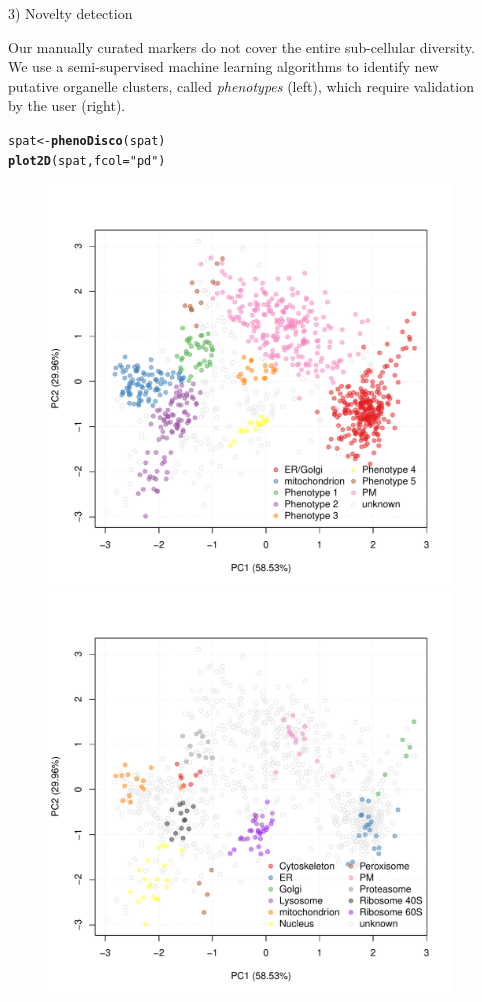 \documentclass[final]{beamer}\usepackage[]{graphicx}\usepackage[]{color}
\makeatletter
\newcommand{\hlstr}[1]{\textcolor[rgb]{0.192,0.494,0.8}{#1}}%
\newcommand{\hlstd}[1]{\textcolor[rgb]{0.345,0.345,0.345}{#1}}%
\newcommand{\hlkwb}[1]{\textcolor[rgb]{0.69,0.353,0.396}{#1}}%
\newcommand{\hlkwc}[1]{\textcolor[rgb]{0.333,0.667,0.333}{#1}}%
\newcommand{\hlkwd}[1]{\textcolor[rgb]{0.737,0.353,0.396}{\textbf{#1}}}%
\newenvironment{kframe}{%
 \def\at@end@of@kframe{}%
 \ifinner\ifhmode%
  \def\at@end@of@kframe{\end{minipage}}%
  \begin{minipage}{\columnwidth}%
 \fi\fi%
 \def\FrameCommand##1{\hskip\@totalleftmargin \hskip-\fboxsep
 \colorbox{shadecolor}{##1}\hskip-\fboxsep
     \hskip-\linewidth \hskip-\@totalleftmargin \hskip\columnwidth}%
 \MakeFramed {\advance\hsize-\width
   \@totalleftmargin\z@ \linewidth\hsize
   \@setminipage}}%
 {\par\unskip\endMakeFramed%
 \at@end@of@kframe}
\newenvironment{knitrout}{}{} %
\makeatother
\begin{document}
\begin{frame}[fragile]
\begin{columns}
\begin{column}{.48\textwidth}
    \end{column}

    \begin{column}{.48\textwidth}  

      \begin{block}{3) Novelty detection}
        
        Our manually curated markers do not cover the entire
        sub-cellular diversity. We use a semi-supervised machine
        learning algorithms to identify new putative organelle
        clusters, called \emph{phenotypes} (left), which require
        validation by the user (right).

\begin{knitrout}
\color{fgcolor}\begin{kframe}
\begin{alltt}
\hlstd{spat} \hlkwb{<-} \hlkwd{phenoDisco}\hlstd{(spat)}
\hlkwd{plot2D}\hlstd{(spat,} \hlkwc{fcol} \hlstd{=} \hlstr{"pd"}\hlstd{)}
\end{alltt}
\end{kframe}
\end{knitrout}

      \begin{figure}
        \centering
        \includegraphics[width=.41\linewidth]{./figures/pca3.pdf}
        \includegraphics[width=.41\linewidth]{./figures/pca4.pdf}
      \end{figure}


\end{block}
\end{column}
\end{columns}
\end{frame}
\end{document}
